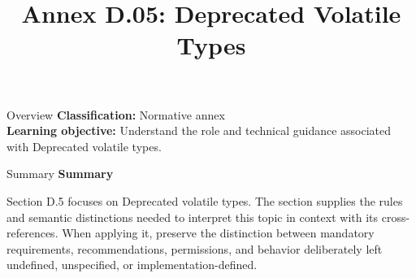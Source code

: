 \documentclass[10pt,letterpaper]{article}
\title{Annex D.05: Deprecated Volatile Types}
\author{}
\date{}
\begin{document}
\maketitle
\begin{CornellOverviewBox}{Overview}
\textbf{Classification:} Normative annex\\[2pt]
\textbf{Learning objective:} Understand the role and technical guidance associated with Deprecated volatile types.
\end{CornellOverviewBox}\begin{CornellSummaryBox}{Summary}
{\sffamily\bfseries\color{Accent} Summary}\par\vspace{3pt}Section D.5 focuses on Deprecated volatile types. The section supplies the rules and semantic distinctions needed to interpret this topic in context with its cross-references. When applying it, preserve the distinction between mandatory requirements, recommendations, permissions, and behavior deliberately left undefined, unspecified, or implementation-defined.
\end{CornellSummaryBox}
\end{document}
